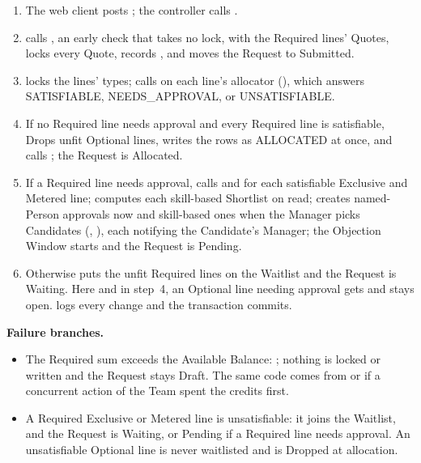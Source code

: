 \begin{enumerate}
\item The web client posts ; the controller calls .
\item {} calls , an early check that takes no lock, with the Required lines' Quotes, locks every Quote, records , and moves the Request to Submitted.
\item {} locks the lines' types;  calls  on each line's allocator (), which answers SATISFIABLE, NEEDS\_APPROVAL, or UNSATISFIABLE.
\item If no Required line needs approval and every Required line is satisfiable,  Drops unfit Optional lines, writes the rows as ALLOCATED at once, and calls ; the Request is Allocated.
\item If a Required line needs approval,  calls  and  for each satisfiable Exclusive and Metered line;  computes each skill-based Shortlist on read;  creates named-Person approvals now and skill-based ones when the Manager picks Candidates (, ), each notifying the Candidate's Manager; the Objection Window starts and the Request is Pending.
\item Otherwise  puts the unfit Required lines on the Waitlist and the Request is Waiting. Here and in step~4, an Optional line needing approval gets  and stays open.  logs every change and the transaction commits.
\end{enumerate}
\par\textbf{Failure branches.}
\begin{itemize}
\item The Required sum exceeds the Available Balance: ; nothing is locked or written and the Request stays Draft. The same code comes from  or  if a concurrent action of the Team spent the credits first.
\item A Required Exclusive or Metered line is unsatisfiable: it joins the Waitlist, and the Request is Waiting, or Pending if a Required line needs approval. An unsatisfiable Optional line is never waitlisted and is Dropped at allocation.
\end{itemize}

